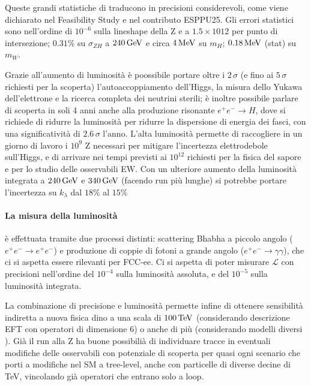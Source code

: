 Queste grandi statistiche di traducono in precisioni considerevoli, come viene dichiarato nel Feasibility Study e nel contributo ESPPU25. Gli errori statistici sono nell'ordine di $10^{-6}$ sulla lineshape della Z e a $1.5\times10{12}$ per punto di intersezione; $0.31\%$ su $\sigma_{ZH}$ a $240\,\mathrm{GeV}$ e circa $4\,\mathrm{MeV}$ su $m_H$; $0.18\,\mathrm{MeV}$ (stat) su $m_W$. 

Grazie all'aumento di luminosità è poossibile portare oltre i $2\,\sigma$ (e fino ai $5\,\sigma$ richiesti per la scoperta) l'autoaccoppiamento dell'Higgs, la misura dello Yukawa dell'elettrone e la ricerca completa dei neutrini sterili; è inoltre possibile parlare di scoperta in soli 4 anni anche alla produzione risonante $e^+e^-\rightarrow H$, dove si richiede di ridurre la luminosità per ridurre la dispersione di energia dei fasci, con una significatività di $2.6\,\sigma$ l'anno. L'alta luminosità permette di raccogliere in un giorno di lavoro i $10^9$ Z necessari per mitigare l'incertezza elettrodebole sull'Higgs, e di arrivare nei tempi previsti ai $10^{12}$ richiesti per la fisica del sapore e per lo studio delle osservabili EW. Con un ulteriore aumento della luminosità integrata a $240\,\mathrm{GeV}$ e $340\,\mathrm{GeV}$ (facendo run più lunghe) si potrebbe portare l'incertezza su $k_\lambda$ dal $18\%$ al $15\%$

\paragraph{La misura della luminosità} è effettuata tramite due processi distinti: scattering Bhabha a piccolo angolo ($e^+e^-\rightarrow e^+e^-$) e produzione di coppie di fotoni a grande angolo ($e^+e^-\rightarrow\gamma\gamma$), che ci si aspetta essere rilevanti per FCC-ee. Ci si aspetta di poter misurare $\mathcal{L}$ con precisioni nell'ordine del $10^{-4}$ sulla luminosità assoluta, e del $10^{-5}$ sulla luminosità integrata.

La combinazione di precisione e luminosità permette infine di ottenere sensibilità indiretta a nuova fisica dino a una scala di $100\,\mathrm{TeV}$ (considerando descrizione EFT con operatori di dimensione 6) o anche di più (considerando modelli diversi ). Già il run alla Z ha buone possibilià di individuare tracce in eventuali modifiche delle osservabili con potenziale di scoperta per quasi ogni scenario che porti a modifiche nel SM a tree-level, anche con particelle di diverse decine di TeV, vincolando già operatori che entrano solo a loop. 

